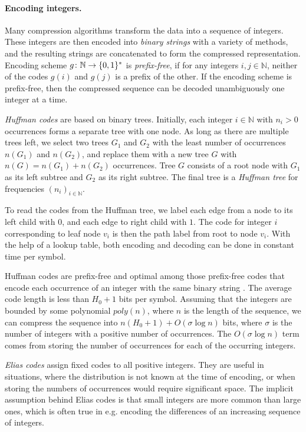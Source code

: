 \paragraph{Encoding integers.}

Many compression algorithms transform the data into a sequence of integers. These integers are then encoded into \emph{binary strings} with a variety of methods, and the resulting strings are concatenated to form the compressed representation. Encoding scheme $g \colon \mathbb{N} \to \{ 0, 1 \}^{\ast}$ is \emph{prefix-free}, if for any integers $i, j \in \mathbb{N}$, neither of the codes $g(i)$ and $g(j)$ is a prefix of the other. If the encoding scheme is prefix-free, then the compressed sequence can be decoded unambiguously one integer at a time.

\emph{Huffman codes} \cite{Huffman1952} are based on binary trees. Initially, each integer $i \in \mathbb{N}$ with $n_{i} > 0$ occurrences forms a separate tree with one node. As long as there are multiple trees left, we select two trees $G_{1}$ and $G_{2}$ with the least number of occurrences $n(G_{1})$ and $n(G_{2})$, and replace them with a new tree $G$ with $n(G) = n(G_{1}) + n(G_{2})$ occurrences. Tree $G$ consists of a root node with $G_{1}$ as its left subtree and $G_{2}$ as its right subtree. The final tree is a \emph{Huffman tree} for frequencies $(n_{i})_{i \in \mathbb{N}}$.

To read the codes from the Huffman tree, we label each edge from a node to its left child with $0$, and each edge to right child with $1$. The code for integer $i$ corresponding to leaf node $v_{i}$ is then the path label from root to node $v_{i}$. With the help of a lookup table, both encoding and decoding can be done in constant time per symbol. 

Huffman codes are prefix-free and optimal among those prefix-free codes that encode each occurrence of an integer with the same binary string \cite{Huffman1952}. The average code length is less than $H_{0} + 1$ bits per symbol. Assuming that the integers are bounded by some polynomial $poly(n)$, where $n$ is the length of the sequence, we can compress the sequence into $n(H_{0} + 1) + O(\sigma \log n)$ bits, where $\sigma$ is the number of integers with a positive number of occurrences. The $O(\sigma \log n)$ term comes from storing the number of occurrences for each of the occurring integers.

\emph{Elias codes} \cite{Elias1975} assign fixed codes to all positive integers. They are useful in situations, where the distribution is not known at the time of encoding, or when storing the numbers of occurrences would require significant space. The implicit assumption behind Elias codes is that small integers are more common than large ones, which is often true in e.g. encoding the differences of an increasing sequence of integers.

